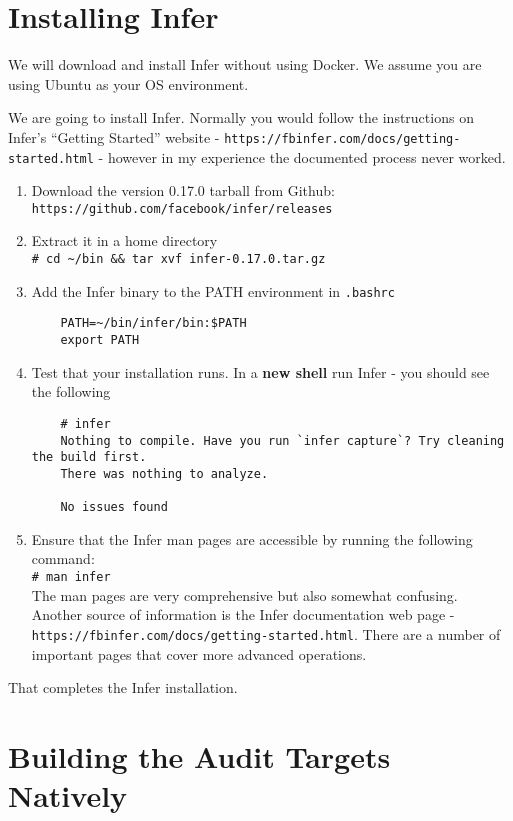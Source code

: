 \appendix

\section{Installing Infer}


We will download and install Infer without using Docker. 
We assume you are using Ubuntu as your OS environment.

We are going to install Infer. Normally you would follow the instructions on Infer's 
``Getting Started'' website - \verb|https://fbinfer.com/docs/getting-started.html| - 
however in my experience the documented process never worked.

\begin{enumerate}
	\itemsep0em 
	\item Download the version 0.17.0 tarball from Github:\\
	\verb|https://github.com/facebook/infer/releases|
	\item Extract it in a home directory \\
	\verb|# cd ~/bin && tar xvf infer-0.17.0.tar.gz |
	\item Add the Infer binary to the PATH environment in \verb|.bashrc|
	\begin{verbatim}
	PATH=~/bin/infer/bin:$PATH	
	export PATH
	\end{verbatim}
	\item Test that your installation runs. In a \textbf{new shell} run Infer - you should see the following
	\begin{verbatim}
	# infer
	Nothing to compile. Have you run `infer capture`? Try cleaning the build first.
	There was nothing to analyze.
	
	No issues found 	 
	\end{verbatim}
	\item Ensure that the Infer man pages are accessible by running the following command:\\
	\verb|# man infer|\\
	The man pages are very comprehensive but also somewhat confusing. Another source of
	information is the Infer documentation web page - \verb|https://fbinfer.com/docs/getting-started.html|. There are a number of important pages that cover more advanced operations. \\
\end{enumerate}

That completes the Infer installation. 

\section{Building the Audit Targets Natively}

